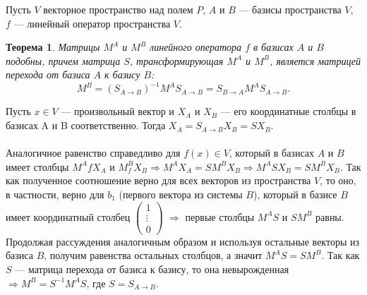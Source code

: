 Пусть $V$ векторное пространство над полем $P$, $A$ и $B$ --- базисы пространства $V$, $f$ --- линейный оператор пространства $V$.
\newtheorem*{th11_5_1}{Теорема}\begin{th11_5_1}Матрицы $M^A$ и $M^B$ линейного оператора $f$ в базисах $A$ и $B$ подобны, причем матрица $S$, трансформирующая $M^A$ и $M^B$, является матрицей перехода от базиса $A$ к базису $B$: $$M^B = (S_{A\rightarrow B})^{-1}M^AS_{A\rightarrow B} =S_{B\rightarrow A}M^AS_{A\rightarrow B} .$$
\end{th11_5_1}\begin{Proof}
	Пусть $x \in V$ --- произвольный вектор и $X_A$ и $X_B$ --- его координатные столбцы в базисах A и B соответственно. Тогда $X_A = S_{A\rightarrow B} X_B = SX_B.$\\\\
	Аналогичное равенство справедливо для $f(x) \in V$, который в базисах $A$ и $B$ имеет столбцы $M^AfX_A$ и $M_f^BX_B \Rightarrow M^A X_A = S M^B X_B \Rightarrow M^A SX_B = SM^BX_B$. Так как полученное соотношение верно для всех векторов из пространства $V$, то оно, в частности, верно для $b_1$ (первого вектора из системы $B$), который в базисе $B$ имеет координатный столбец $\begin{pmatrix}
		1\\ \vdots \\0
	\end{pmatrix}$ $\Rightarrow$ первые столбцы $M^A S$ и $SM^B$ равны. Продолжая рассуждения аналогичным образом и используя остальные векторы из базиса $B$, получим равенства остальных столбцов, а значит $M^A S = SM^B$. Так как $S$ --- матрица перехода от базиса к базису, то она невырожденная $\Rightarrow  M^B = S^{-1}M^A S$, где $S = S_{A\rightarrow B}.$
\end{Proof}












